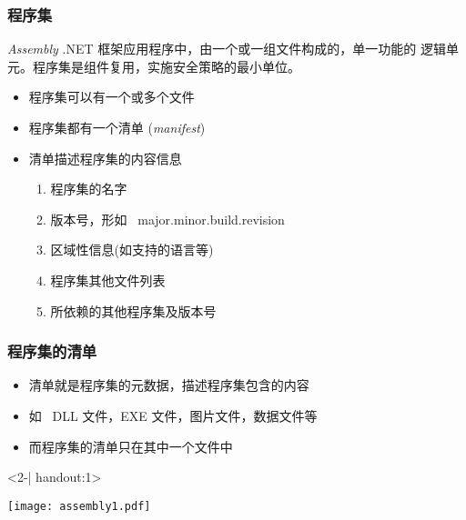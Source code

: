 \begin{frame}
\frametitle{程序集}
\begin{block}{\textit{Assembly}}
  \CJKindent \small .NET 框架应用程序中，由一个或一组文件构成的，单一功能的
  逻辑单元。程序集是组件复用，实施安全策略的最小单位。
\end{block}
\pause
\begin{itemize}
\item 程序集可以有一个或多个文件 \pause
\item 程序集都有一个{清单} (\textit{manifest}{}) \pause
\item 清单描述程序集的内容信息
  \begin{enumerate}
  \item 程序集的名字
  \item 版本号，形如 ~major.minor.build.revision
  \item 区域性信息(如支持的语言等)
  \item 程序集其他文件列表
  \item 所依赖的其他程序集及版本号
  \end{enumerate}
\end{itemize}
\end{frame}

\begin{frame}[t]
\frametitle{程序集的清单}

\begin{itemize}
\item 清单就是程序集的元数据，描述程序集包含的内容
\item 如 ~DLL 文件，EXE 文件，图片文件，数据文件等
\item 而程序集的清单只在其中一个文件中
\end{itemize}

\begin{onlyenv}<2-| handout:1>
  \begin{center}
    \texttt{[image: assembly1.pdf]}
  \end{center}
\end{onlyenv}
\end{frame}

